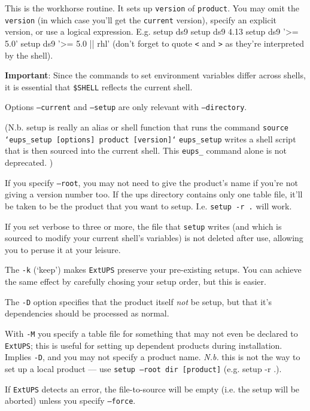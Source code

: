 \documentclass{article}
\newcommand{\code}[1]{\texttt{#1}}
\newcommand{\eups}{\code{ExtUPS}}
\let\overbatim=\verbatim
\let\oendverbatim=\endverbatim
\renewenvironment{verbatim}
{\center\minipage{16cm}\overbatim}
{\oendverbatim\endminipage\endcenter}
\begin{document}
This is the workhorse routine. It sets up \code{version} of \code{product}. You
may omit the \code{version} (in which case you'll get the \code{current} version),
specify an explicit version, or use a logical expression. E.g.
\begin{verbatim}
  setup ds9
  setup ds9 4.13
  setup ds9 '>= 5.0'
  setup ds9 '>= 5.0 || rhl'
\end{verbatim}
(don't forget to quote \code{<} and \code{>} as they're interpreted by the shell).

\textbf{Important}: Since the commands to set environment variables differ across shells,
it is essential that \code{\$SHELL} reflects the current shell.

Options \code{--current} and \code{--setup} are only relevant with \code{--directory}.

(N.b. setup is really an alias or shell function that runs the command\hfil\break
\code{source `eups\_setup [options] product [version]`}\hfil\break
\code{eups\_setup} writes a shell script that is then sourced into the
current shell.  This \code{eups\_} command alone is not deprecated.
)

If you specify \code{--root}, you may not need to give the
product's name if you're not giving a version number too.
If the ups directory contains only one
table file, it'll be taken to be the product that you
want to setup.  I.e. \code{setup -r .} will work.

If you set verbose to three or more, the file that \code{setup} writes (and
which is sourced to modify your current shell's variables) is not deleted
after use, allowing you to peruse it at your leisure.

The \code{-k} (`keep') makes \eups{} preserve your pre-existing setups.
You can achieve the same effect
by carefully chosing your setup order, but this is easier.

The \code{-D} option specifies that the product itself \textit{not} be
setup, but that it's dependencies should be processed as normal.

With \code{-M} you specify a table file for something that may not
even be declared to \eups{}; this is useful for setting up dependent
products during installation.  Implies \code{-D}, and you may not
specify a product name. \emph{N.b.} this is not the way to set up
a local product --- use \code{setup --root dir [product]} (e.g. setup -r .).

If \eups{} detects an error, the file-to-source will be empty (i.e.
the setup will be aborted) unless you specify \code{--force}.
\end{document}
